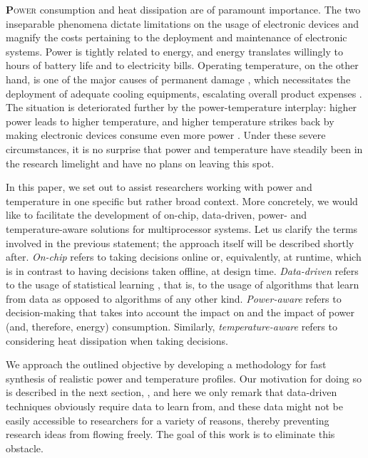 \lettrine[findent=0.4em, nindent=0em]{\textbf{P}}{ower} consumption and heat
dissipation are of paramount importance. The two inseparable phenomena dictate
limitations on the usage of electronic devices and magnify the costs pertaining
to the deployment and maintenance of electronic systems. Power is tightly
related to energy, and energy translates willingly to hours of battery life and
to electricity bills. Operating temperature, on the other hand, is one of the
major causes of permanent damage \cite{jedec}, which necessitates the deployment
of adequate cooling equipments, escalating overall product expenses
\cite{chaudhry2015}. The situation is deteriorated further by the
power-temperature interplay: higher power leads to higher temperature, and
higher temperature strikes back by making electronic devices consume even more
power \cite{liu2007}. Under these severe circumstances, it is no surprise that
power and temperature have steadily been in the research limelight and have no
plans on leaving this spot.

In this paper, we set out to assist researchers working with power and
temperature in one specific but rather broad context. More concretely, we would
like to facilitate the development of on-chip, data-driven, power- and
temperature-aware solutions for multiprocessor systems. Let us clarify the terms
involved in the previous statement; the approach itself will be described
shortly after. \emph{On-chip} refers to taking decisions online or,
equivalently, at runtime, which is in contrast to having decisions taken
offline, at design time. \emph{Data-driven} refers to the usage of statistical
learning \cite{bishop2006}, that is, to the usage of algorithms that learn from
data as opposed to algorithms of any other kind. \emph{Power-aware} refers to
decision-making that takes into account the impact on and the impact of power
(and, therefore, energy) consumption. Similarly, \emph{temperature-aware} refers
to considering heat dissipation when taking decisions.

We approach the outlined objective by developing a methodology for fast
synthesis of realistic power and temperature profiles. Our motivation for doing
so is described in the next section, , and here we only remark
that data-driven techniques obviously require data to learn from, and these data
might not be easily accessible to researchers for a variety of reasons, thereby
preventing research ideas from flowing freely. The goal of this work is to
eliminate this obstacle.

